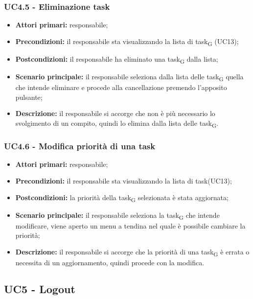 \subsubsection{UC4.5 - Eliminazione task}

\begin{itemize}
	\item 	\textbf{Attori primari:} responsabile;
	\item 	\textbf{Precondizioni:} il responsabile sta visualizzando la lista di task\textsubscript{G} (UC13);
	\item 	\textbf{Postcondizioni:} il responsabile ha eliminato una task\textsubscript{G} dalla lista;
	\item 	\textbf{Scenario principale:} il responsabile seleziona dalla lista delle task\textsubscript{G} quella che intende eliminare e procede alla cancellazione premendo l'apposito pulsante;
	\item 	\textbf{Descrizione:} il responsabile si accorge che non è più necessario lo svolgimento di un compito, quindi lo elimina dalla lista delle task\textsubscript{G}.

\end{itemize}

\subsubsection{UC4.6 - Modifica priorità di una task}
\begin{itemize}
	\item 	\textbf{Attori primari:} responsabile;
	\item 	\textbf{Precondizioni:} il responsabile sta visualizzando la lista di task(UC13);
	\item 	\textbf{Postcondizioni:} la priorità della task\textsubscript{G} selezionata è stata aggiornata;
	\item 	\textbf{Scenario principale:} il responsabile seleziona la task\textsubscript{G} che intende modificare, viene aperto un menu a tendina nel quale è possibile cambiare la priorità;
	\item 	\textbf{Descrizione:} il responsabile si accorge che la priorità di una task\textsubscript{G} è errata o necessita di un aggiornamento, quindi procede con la modifica.
\end{itemize}

\subsection{UC5 - Logout}

